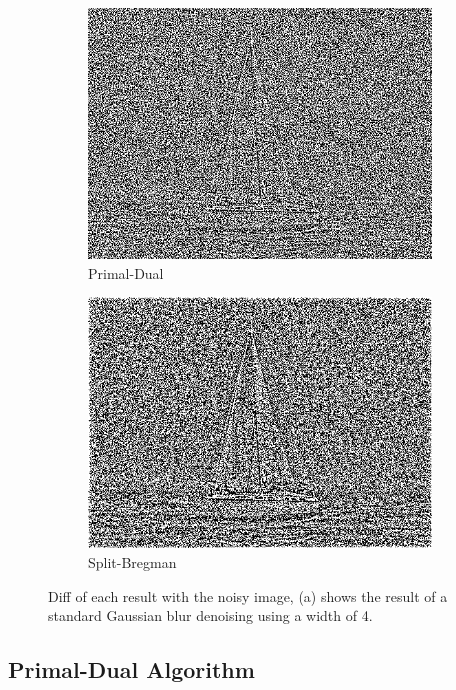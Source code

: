 \documentclass[11pt]{article}
\begin{document}
\begin{figure}
\begin{subfigure}[b]{0.4\textwidth}
\includegraphics[width=\textwidth]{sail_pd_diff}
\caption{Primal-Dual}
\label{sail:pd:diff}
\end{subfigure}
\begin{subfigure}[b]{0.4\textwidth}
\centering
\includegraphics[width=\textwidth]{sail_sb_diff}
\caption{Split-Bregman}
\label{sail:sb:diff}
\end{subfigure}
\caption{Diff of each result with the noisy image, (a) shows the result of a standard Gaussian blur denoising using a width of 4.}
\label{fig:sailboat:diff}
\end{figure}




\subsection{Primal-Dual Algorithm}
\end{document}
